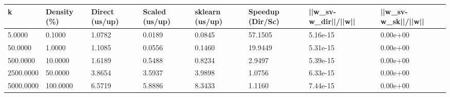 \begin{table}[htbp]
\centering
\begin{tabular}{llllllll}
\toprule
k & Density (\%) & Direct (us/up) & Scaled (us/up) & sklearn (us/up) & Speedup (Dir/Sc) & ||w\_sv-w\_dir||/||w|| & ||w\_sv-w\_sk||/||w|| \\
\midrule
5.0000 & 0.1000 & 1.0782 & 0.0189 & 0.0845 & 57.1505 & 5.16e-15 & 0.00e+00 \\
50.0000 & 1.0000 & 1.1085 & 0.0556 & 0.1460 & 19.9449 & 5.31e-15 & 0.00e+00 \\
500.0000 & 10.0000 & 1.6189 & 0.5488 & 0.8234 & 2.9497 & 5.39e-15 & 0.00e+00 \\
2500.0000 & 50.0000 & 3.8654 & 3.5937 & 3.9898 & 1.0756 & 6.33e-15 & 0.00e+00 \\
5000.0000 & 100.0000 & 6.5719 & 5.8886 & 8.3433 & 1.1160 & 7.44e-15 & 0.00e+00 \\
\bottomrule
\end{tabular}
\end{table}
